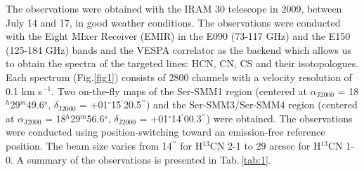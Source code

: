 \documentclass[a4paper]{article}
\begin{document}
\indent \indent The observations were obtained with the IRAM 30 telescope in 2009, between July 14 and 17, in good weather conditions. The observations were conducted with the Eight MIxer Receiver (EMIR) in the E090 (73-117 GHz) and the E150 (125-184 GHz) bands and the VESPA correlator as the backend which allows us to obtain the spectra of the targeted lines: HCN, CN, CS and their isotopologues. Each spectrum (Fig.\ref{fig1}) consists of 2800 channels with a velocity resolution of 0.1 km s$^{-1}$. Two on-the-fly maps of the Ser-SMM1 region (centered at $\alpha_\mathrm{J2000}$ = 18$^h$29$^m$49.6$^s$, $\delta_\mathrm{J2000}$ = +01$^{\circ}$15$^{\prime}$20.5$^{\prime\prime}$) and the Ser-SMM3/Ser-SMM4 region (centered at $\alpha_\mathrm{J2000}$ = 18$^h$29$^m$56.6$^s$, $\delta_\mathrm{J2000}$ = +01$^{\circ}$14$^{\prime}$00.3$^{\prime\prime}$) were obtained. The observations were conducted using position-switching toward an emission-free reference position. The beam size varies from 14$^{\prime\prime}$ for H$^{13}$CN 2-1 to 29 arcsec for H$^{13}$CN 1-0. A summary of the observations is presented in Tab.\,\ref{tab:1}.
\end{document}
